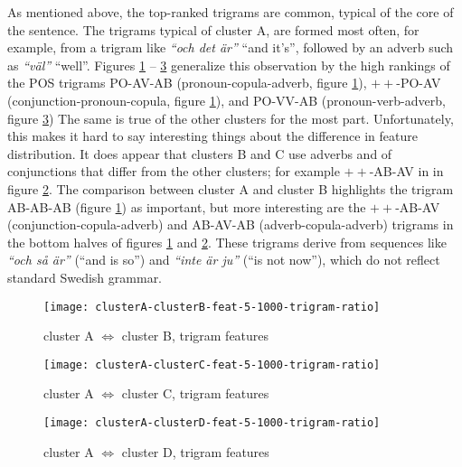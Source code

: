 As mentioned above, the top-ranked trigrams are common, typical of the
core of the sentence. The trigrams typical of cluster A, are formed
most often, for example, from a trigram like \textit{ ``och det
  \"ar''} ``and it's'', followed by an adverb such as
\textit{``v\"al''} ``well''. Figures
\ref{clusterA-clusterB-feat-5-1000-trigram-ratio} --
\ref{clusterA-clusterD-feat-5-1000-trigram-ratio} generalize this
observation by the high rankings of the POS trigrams PO-AV-AB
(pronoun-copula-adverb, figure
\ref{clusterA-clusterB-feat-5-1000-trigram-ratio}), $++$-PO-AV
(conjunction-pronoun-copula, figure
\ref{clusterA-clusterB-feat-5-1000-trigram-ratio}), and PO-VV-AB
(pronoun-verb-adverb, figure
\ref{clusterA-clusterD-feat-5-1000-trigram-ratio}) The same is true of
the other clusters for the most part. Unfortunately, this makes it
hard to say interesting things about the difference in feature
distribution. It does appear that clusters B and C use adverbs and of
conjunctions that differ from the other clusters; for example
$++$-AB-AV in in figure
\ref{clusterA-clusterC-feat-5-1000-trigram-ratio}. The comparison
between cluster A and cluster B highlights the trigram AB-AB-AB
(figure \ref{clusterA-clusterB-feat-5-1000-trigram-ratio}) as
important, but more interesting are the $++$-AB-AV
(conjunction-copula-adverb) and AB-AV-AB (adverb-copula-adverb)
trigrams in the bottom halves of figures
\ref{clusterA-clusterB-feat-5-1000-trigram-ratio} and
\ref{clusterA-clusterC-feat-5-1000-trigram-ratio}. These trigrams
derive from sequences like \textit{``och s\aa{} \"ar''} (``and is
so'') and \textit{``inte \"ar ju''} (``is not now''), which do
not reflect standard Swedish grammar.


\begin{figure}
  \texttt{[image: clusterA-clusterB-feat-5-1000-trigram-ratio]}
  \caption{cluster A $\Leftrightarrow$ cluster B, trigram features}
  \label{clusterA-clusterB-feat-5-1000-trigram-ratio}
\end{figure}
\begin{figure}
  \texttt{[image: clusterA-clusterC-feat-5-1000-trigram-ratio]}
  \caption{cluster A $\Leftrightarrow$ cluster C, trigram features}
  \label{clusterA-clusterC-feat-5-1000-trigram-ratio}
\end{figure}
\begin{figure}
  \texttt{[image: clusterA-clusterD-feat-5-1000-trigram-ratio]}
  \caption{cluster A $\Leftrightarrow$ cluster D, trigram features}
  \label{clusterA-clusterD-feat-5-1000-trigram-ratio}
\end{figure}


